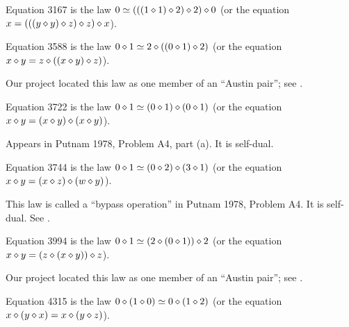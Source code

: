 \begin{definition}[Equation 3167]\label{eq3167}\leanok{}  Equation 3167 is the law $0 \simeq  (((1 \diamond 1) \diamond 2) \diamond 2) \diamond 0$ (or the equation $x = (((y \diamond y) \diamond z) \diamond z) \diamond x$).
\end{definition}


\begin{definition}[Equation 3588]
  \label{eq3588}\leanok{}
  Equation 3588 is the law $0 \diamond 1 \simeq 2 \diamond ((0 \diamond 1) \diamond 2)$ (or the equation $x \diamond y = z \diamond ((x \diamond y) \diamond z)$).
\end{definition}

Our project located this law as one member of an ``Austin pair''; see .

\begin{definition}[Equation 3722]\label{eq3722}\leanok{}  Equation 3722 is the law $0 \diamond 1  \simeq  (0 \diamond 1) \diamond (0 \diamond 1)$ (or the equation $x \diamond y = (x \diamond y) \diamond (x \diamond y)$).
\end{definition}

Appears in Putnam 1978, Problem A4, part (a).  It is self-dual.

\begin{definition}[Equation 3744]\label{eq3744}\leanok{}  Equation 3744 is the law $0 \diamond 1  \simeq  (0 \diamond 2) \diamond (3 \diamond 1)$ (or the equation $x \diamond y = (x \diamond z) \diamond (w \diamond y)$).
\end{definition}

This law is called a ``bypass operation'' in Putnam 1978, Problem A4. It is self-dual.  See .

\begin{definition}[Equation 3994]
  \label{eq3994}
  Equation 3994 is the law $0 \diamond 1 \simeq (2 \diamond (0 \diamond 1)) \diamond 2$ (or the equation $x \diamond y = (z \diamond (x \diamond y)) \diamond z$).
\end{definition}

Our project located this law as one member of an ``Austin pair''; see .

\begin{definition}[Equation 4315]\label{eq4315}\leanok{}  Equation 4315 is the law $0 \diamond (1 \diamond 0)  \simeq  0 \diamond (1 \diamond 2)$ (or the equation $x \diamond (y \diamond x) = x \diamond (y \diamond z)$).
\end{definition}

